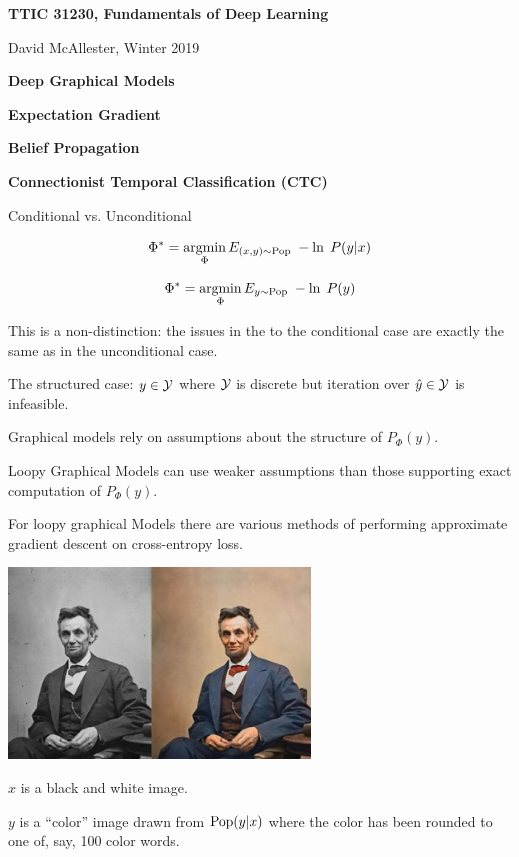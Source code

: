 




{\Huge

  \centerline{\bf TTIC 31230, Fundamentals of Deep Learning}
  \bigskip
  \centerline{David McAllester, Winter 2019}
  \vfill
  \centerline{\bf Deep Graphical Models}
  \vfill
  \centerline{\bf Expectation Gradient}
  \vfill
  \centerline{\bf Belief Propagation}
  \vfill
  \centerline{\bf Connectionist Temporal Classification (CTC)}
\vfill
\vfill
\vfill
{}

Conditional vs. Unconditional

\vfill
$$\Phi^* = \operatorname*{argmin}_\Phi E_{(x,y) \sim \mathrm{Pop}}\;-\ln \;P(y|x)$$

\vfill
$$\Phi^* = \operatorname*{argmin}_\Phi E_{y \sim \mathrm{Pop}}\;-\ln \;P(y)$$

\vfill
This is a non-distinction: the issues in the to the conditional case
are exactly the same as in the unconditional case.


The structured case: $y \in {\cal Y}$ where ${\cal Y}$ is discrete but iteration over $\hat{y} \in {\cal Y}$ is infeasible.

\vfill
{\color{red} Graphical models rely on assumptions about the structure of $P_\Phi(y)$.}

\vfill
{\color{red} Loopy Graphical Models can use weaker assumptions than those supporting exact computation of $P_\Phi(y)$.}

\vfill
{\color{red} For loopy graphical Models there are various methods of performing approximate gradient descent on cross-entropy loss.}


\centerline{\includegraphics[height = 2in]{../images/colorization}}

$x$ is a black and white image.

\vfill
$y$ is a ``color'' image drawn from $\mathrm{Pop}(y|x)$ where the color has been rounded to one of, say, 100 color words.

}
